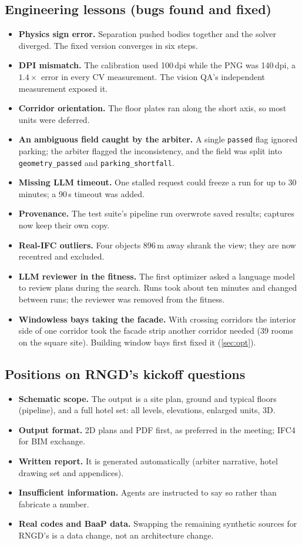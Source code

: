 \documentclass[10pt,a4paper]{article}
\newcommand{\code}[1]{\texttt{\small #1}}
\theoremstyle{definition}
\begin{document}
\subsection{Engineering lessons (bugs found and fixed)}
\begin{itemize}
\item \textbf{Physics sign error.} Separation pushed bodies together and the solver diverged. The fixed version converges in six steps.
\item \textbf{DPI mismatch.} The calibration used 100\,dpi while the PNG was 140\,dpi, a $1.4\times$ error in every CV measurement. The vision QA's independent measurement exposed it.
\item \textbf{Corridor orientation.} The floor plates ran along the short axis, so most units were deferred.
\item \textbf{An ambiguous field caught by the arbiter.} A single \code{passed} flag ignored parking; the arbiter flagged the inconsistency, and the field was split into \code{geometry\_passed} and \code{parking\_shortfall}.
\item \textbf{Missing LLM timeout.} One stalled request could freeze a run for up to 30 minutes; a 90\,s timeout was added.
\item \textbf{Provenance.} The test suite's pipeline run overwrote saved results; captures now keep their own copy.
\item \textbf{Real-IFC outliers.} Four objects 896\,m away shrank the view; they are now recentred and excluded.
\item \textbf{LLM reviewer in the fitness.} The first optimizer asked a language model to review plans during the search. Runs took about ten minutes and changed between runs; the reviewer was removed from the fitness.
\item \textbf{Windowless bays taking the facade.} With crossing corridors the interior side of one corridor took the facade strip another corridor needed (39 rooms on the square site). Building window bays first fixed it (\cref{sec:opt}).
\end{itemize}

\subsection{Positions on RNGD's kickoff questions}
\begin{itemize}
\item \textbf{Schematic scope.} The output is a site plan, ground and typical floors (pipeline), and a full hotel set: all levels, elevations, enlarged units, 3D.
\item \textbf{Output format.} 2D plans and PDF first, as preferred in the meeting; IFC4 for BIM exchange.
\item \textbf{Written report.} It is generated automatically (arbiter narrative, hotel drawing set and appendices).
\item \textbf{Insufficient information.} Agents are instructed to say so rather than fabricate a number.
\item \textbf{Real codes and BaaP data.} Swapping the remaining synthetic sources for RNGD's is a data change, not an architecture change.
\end{itemize}
\end{document}
